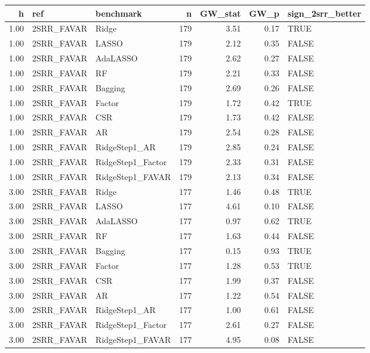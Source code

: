 \begin{table}[ht]
\centering
\begin{tabular}{rllrrrl}
  \hline
h & ref & benchmark & n & GW\_stat & GW\_p & sign\_2srr\_better \\ 
  \hline
1.00 & 2SRR\_FAVAR & Ridge & 179 & 3.51 & 0.17 & TRUE \\ 
  1.00 & 2SRR\_FAVAR & LASSO & 179 & 2.12 & 0.35 & FALSE \\ 
  1.00 & 2SRR\_FAVAR & AdaLASSO & 179 & 2.62 & 0.27 & FALSE \\ 
  1.00 & 2SRR\_FAVAR & RF & 179 & 2.21 & 0.33 & FALSE \\ 
  1.00 & 2SRR\_FAVAR & Bagging & 179 & 2.69 & 0.26 & FALSE \\ 
  1.00 & 2SRR\_FAVAR & Factor & 179 & 1.72 & 0.42 & TRUE \\ 
  1.00 & 2SRR\_FAVAR & CSR & 179 & 1.73 & 0.42 & FALSE \\ 
  1.00 & 2SRR\_FAVAR & AR & 179 & 2.54 & 0.28 & FALSE \\ 
  1.00 & 2SRR\_FAVAR & RidgeStep1\_AR & 179 & 2.85 & 0.24 & FALSE \\ 
  1.00 & 2SRR\_FAVAR & RidgeStep1\_Factor & 179 & 2.33 & 0.31 & FALSE \\ 
  1.00 & 2SRR\_FAVAR & RidgeStep1\_FAVAR & 179 & 2.13 & 0.34 & FALSE \\ 
  3.00 & 2SRR\_FAVAR & Ridge & 177 & 1.46 & 0.48 & TRUE \\ 
  3.00 & 2SRR\_FAVAR & LASSO & 177 & 4.61 & 0.10 & FALSE \\ 
  3.00 & 2SRR\_FAVAR & AdaLASSO & 177 & 0.97 & 0.62 & TRUE \\ 
  3.00 & 2SRR\_FAVAR & RF & 177 & 1.63 & 0.44 & FALSE \\ 
  3.00 & 2SRR\_FAVAR & Bagging & 177 & 0.15 & 0.93 & TRUE \\ 
  3.00 & 2SRR\_FAVAR & Factor & 177 & 1.28 & 0.53 & TRUE \\ 
  3.00 & 2SRR\_FAVAR & CSR & 177 & 1.99 & 0.37 & FALSE \\ 
  3.00 & 2SRR\_FAVAR & AR & 177 & 1.22 & 0.54 & FALSE \\ 
  3.00 & 2SRR\_FAVAR & RidgeStep1\_AR & 177 & 1.00 & 0.61 & FALSE \\ 
  3.00 & 2SRR\_FAVAR & RidgeStep1\_Factor & 177 & 2.61 & 0.27 & FALSE \\ 
  3.00 & 2SRR\_FAVAR & RidgeStep1\_FAVAR & 177 & 4.95 & 0.08 & FALSE \\ 

\end{tabular}
\end{table}

